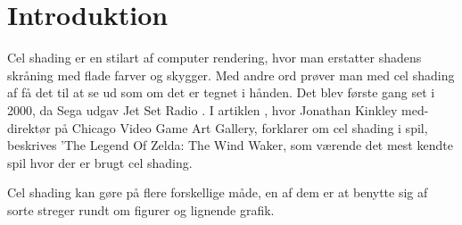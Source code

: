 \newpage
\section{Introduktion}
\setcounter{page}{1}
Cel shading er en stilart af computer rendering, hvor man erstatter shadens skråning med flade farver og skygger. Med andre ord prøver man med cel shading af få det til at se ud som om det er tegnet i hånden. Det blev første gang set i 2000, da Sega udgav Jet Set Radio \cite{tvtropes2016}.
I artiklen \cite{Kinkley2016}, hvor Jonathan Kinkley med-direktør på Chicago Video Game Art Gallery, forklarer om cel shading i spil, beskrives ’The Legend Of Zelda: The Wind Waker, som værende det mest kendte spil hvor der er brugt cel shading. 

Cel shading kan gøre på flere forskellige måde, en af dem er at benytte sig af sorte streger rundt om figurer og lignende grafik. 